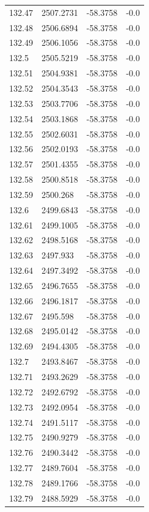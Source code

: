\begin{table}[H]
\begin{tabular}{llll}
132.47 & 2507.2731 & -58.3758 & -0.0 \\
132.48 & 2506.6894 & -58.3758 & -0.0 \\
132.49 & 2506.1056 & -58.3758 & -0.0 \\
132.5 & 2505.5219 & -58.3758 & -0.0 \\
132.51 & 2504.9381 & -58.3758 & -0.0 \\
132.52 & 2504.3543 & -58.3758 & -0.0 \\
132.53 & 2503.7706 & -58.3758 & -0.0 \\
132.54 & 2503.1868 & -58.3758 & -0.0 \\
132.55 & 2502.6031 & -58.3758 & -0.0 \\
132.56 & 2502.0193 & -58.3758 & -0.0 \\
132.57 & 2501.4355 & -58.3758 & -0.0 \\
132.58 & 2500.8518 & -58.3758 & -0.0 \\
132.59 & 2500.268 & -58.3758 & -0.0 \\
132.6 & 2499.6843 & -58.3758 & -0.0 \\
132.61 & 2499.1005 & -58.3758 & -0.0 \\
132.62 & 2498.5168 & -58.3758 & -0.0 \\
132.63 & 2497.933 & -58.3758 & -0.0 \\
132.64 & 2497.3492 & -58.3758 & -0.0 \\
132.65 & 2496.7655 & -58.3758 & -0.0 \\
132.66 & 2496.1817 & -58.3758 & -0.0 \\
132.67 & 2495.598 & -58.3758 & -0.0 \\
132.68 & 2495.0142 & -58.3758 & -0.0 \\
132.69 & 2494.4305 & -58.3758 & -0.0 \\
132.7 & 2493.8467 & -58.3758 & -0.0 \\
132.71 & 2493.2629 & -58.3758 & -0.0 \\
132.72 & 2492.6792 & -58.3758 & -0.0 \\
132.73 & 2492.0954 & -58.3758 & -0.0 \\
132.74 & 2491.5117 & -58.3758 & -0.0 \\
132.75 & 2490.9279 & -58.3758 & -0.0 \\
132.76 & 2490.3442 & -58.3758 & -0.0 \\
132.77 & 2489.7604 & -58.3758 & -0.0 \\
132.78 & 2489.1766 & -58.3758 & -0.0 \\
132.79 & 2488.5929 & -58.3758 & -0.0 \\

\end{tabular}
\end{table}
